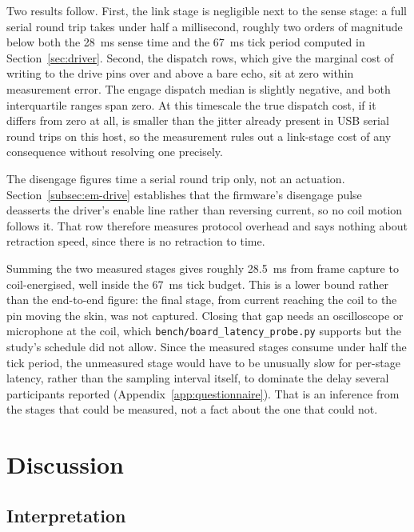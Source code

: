 \documentclass[12pt, a4paper, twoside, openright]{report}
\begin{document}
Two results follow. First, the link stage is negligible next to the sense
stage: a full serial round trip takes under half a millisecond, roughly two
orders of magnitude below both the \SI{28}{\milli\second} sense time and the
\SI{67}{\milli\second} tick period computed in Section~\ref{sec:driver}.
Second, the dispatch rows, which give the marginal cost of writing to the
drive pins over and above a bare echo, sit at zero within measurement error.
The engage dispatch median is slightly negative, and both interquartile ranges
span zero. At this timescale the true dispatch cost, if it differs from zero at
all, is smaller than the jitter already present in USB serial round trips on
this host, so the measurement rules out a link-stage cost of any consequence
without resolving one precisely.

The disengage figures time a serial round trip only, not an actuation.
Section~\ref{subsec:em-drive} establishes that the firmware's disengage pulse
deasserts the driver's enable line rather than reversing current, so no coil
motion follows it. That row therefore measures protocol overhead and says
nothing about retraction speed, since there is no retraction to time.

Summing the two measured stages gives roughly \SI{28.5}{\milli\second} from
frame capture to coil-energised, well inside the \SI{67}{\milli\second} tick
budget. This is a lower bound rather than the end-to-end figure: the final
stage, from current reaching the coil to the pin moving the skin, was not
captured. Closing that gap needs an oscilloscope or microphone at the coil,
which \texttt{bench/board\_latency\_probe.py} supports but the study's
schedule did not allow. Since the measured stages consume under half the tick
period, the unmeasured stage would have to be unusually slow for per-stage
latency, rather than the sampling interval itself, to dominate the delay
several participants reported (Appendix~\ref{app:questionnaire}). That is an
inference from the stages that could be measured, not a fact about the one
that could not.

\chapter{Discussion}
\label{ch:discussion}

\section{Interpretation}
\label{sec:interpretation}
\end{document}
